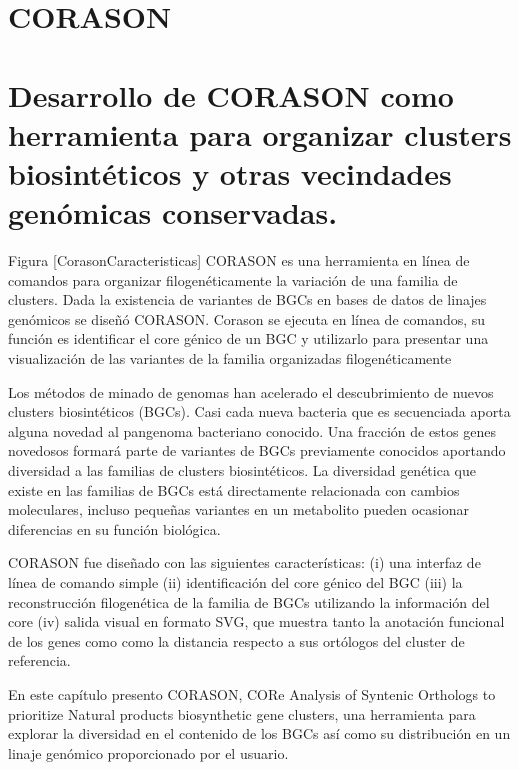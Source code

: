 \documentclass[12pt,twoside]{reedthesis}
\begin{document}
  \hypertarget{ref_labels}{\chapter{CORASON}\label{ref_labels}}
  
  \chapter{Desarrollo de CORASON como herramienta para organizar clusters
  biosintéticos y otras vecindades genómicas
  conservadas.}\label{desarrollo-de-corason-como-herramienta-para-organizar-clusters-biosinteticos-y-otras-vecindades-genomicas-conservadas.}
  
  Figura {[}CorasonCaracteristicas{]} CORASON es una herramienta en línea
  de comandos para organizar filogenéticamente la variación de una familia
  de clusters. Dada la existencia de variantes de BGCs en bases de datos
  de linajes genómicos se diseñó CORASON. Corason se ejecuta en línea de
  comandos, su función es identificar el core génico de un BGC y
  utilizarlo para presentar una visualización de las variantes de la
  familia organizadas filogenéticamente
  
  Los métodos de minado de genomas han acelerado el descubrimiento de
  nuevos clusters biosintéticos (BGCs). Casi cada nueva bacteria que es
  secuenciada aporta alguna novedad al pangenoma bacteriano conocido. Una
  fracción de estos genes novedosos formará parte de variantes de BGCs
  previamente conocidos aportando diversidad a las familias de clusters
  biosintéticos. La diversidad genética que existe en las familias de BGCs
  está directamente relacionada con cambios moleculares, incluso pequeñas
  variantes en un metabolito pueden ocasionar diferencias en su función
  biológica.
  
  CORASON fue diseñado con las siguientes características: (i) una
  interfaz de línea de comando simple (ii) identificación del core génico
  del BGC (iii) la reconstrucción filogenética de la familia de BGCs
  utilizando la información del core (iv) salida visual en formato SVG,
  que muestra tanto la anotación funcional de los genes como como la
  distancia respecto a sus ortólogos del cluster de referencia.
  
  En este capítulo presento CORASON, CORe Analysis of Syntenic Orthologs
  to prioritize Natural products biosynthetic gene clusters, una
  herramienta para explorar la diversidad en el contenido de los BGCs así
  como su distribución en un linaje genómico proporcionado por el usuario.
  
\end{document}
